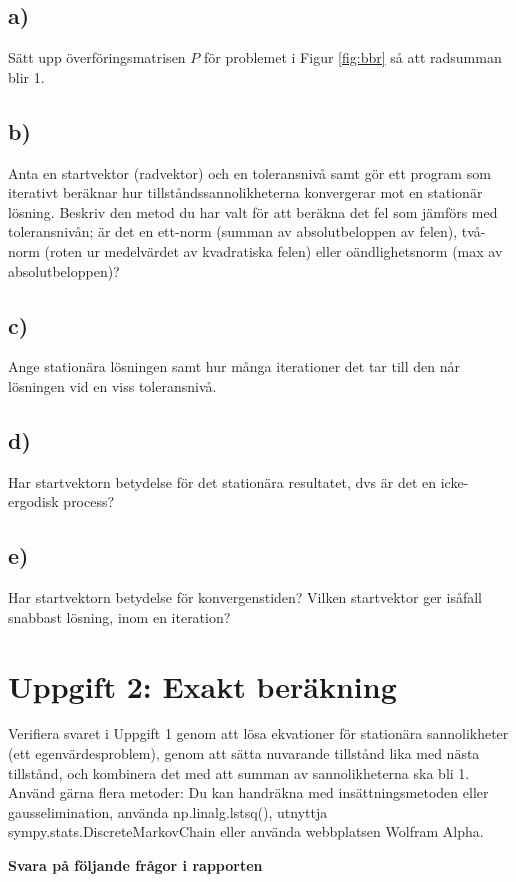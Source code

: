 \documentclass[a4paper]{article}
\begin{document}
\subsection{a)}
Sätt upp överföringsmatrisen \( P \) för problemet i Figur \ref{fig:bbr} så att radsumman blir 1.

\subsection{b)}
Anta en startvektor (radvektor) och en toleransnivå samt gör ett program som iterativt
beräknar hur tillståndssannolikheterna konvergerar mot en stationär lösning. Beskriv den
metod du har valt för att beräkna det fel som jämförs med toleransnivån; är det en ett-norm
(summan av absolutbeloppen av felen), två-norm (roten ur medelvärdet av kvadratiska
felen) eller oändlighetsnorm (max av absolutbeloppen)?

\subsection{c)}
Ange stationära lösningen samt hur många iterationer det tar till den når lösningen vid en
viss toleransnivå.

\subsection{d)}
Har startvektorn betydelse för det stationära resultatet, dvs är det en icke-ergodisk process?

\subsection{e)}
Har startvektorn betydelse för konvergenstiden? Vilken startvektor ger isåfall snabbast
lösning, inom en iteration?

\section{Uppgift 2: Exakt beräkning}
Verifiera svaret i Uppgift 1 genom att lösa ekvationer för stationära sannolikheter
(ett egenvärdesproblem), genom att sätta nuvarande tillstånd lika med nästa tillstånd, och
kombinera det med att summan av sannolikheterna ska bli 1. Använd gärna flera metoder: Du
kan handräkna med insättningsmetoden eller gausselimination,
använda np.linalg.lstsq(), utnyttja sympy.stats.DiscreteMarkovChain eller använda
webbplatsen Wolfram Alpha.

\textbf{Svara på följande frågor i rapporten}
\end{document}
